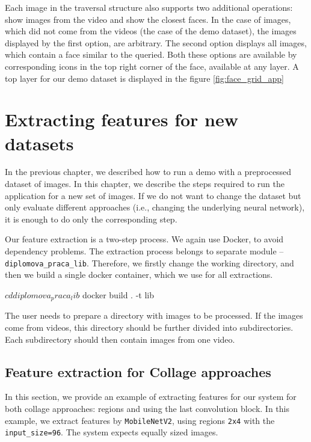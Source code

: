 Each image in the traversal structure also supports two additional operations: show images from the video and show the closest faces. In the case of images, which did not come from the videos (the case of the demo dataset), the images displayed by the first option, are arbitrary. The second option displays all images, which contain a face similar to the queried. Both these options are available by corresponding icons in the top right corner of the face, available at any layer. A top layer for our demo dataset is displayed in the figure \ref{fig:face_grid_app}


\chapter{Extracting features for new datasets}
\label{ch:custom_dataset}

In the previous chapter, we described how to run a demo with a preprocessed dataset of images. In this chapter, we describe the steps required to run the application for a new set of images. If we do not want to change the dataset but only evaluate different approaches (i.e., changing the underlying neural network), it is enough to do only the corresponding step.

Our feature extraction is a two-step process. We again use Docker, to avoid dependency problems. The extraction process belongs to separate module -- \verb+diplomova_praca_lib+. Therefore, we firstly change the working directory, and then we build a single docker container, which we use for all extractions.

\vspace{0.5cm}
\begin{boxedverbatim}
$ cd diplomova_praca_lib
$ docker build . -t lib
\end{boxedverbatim}
\vspace{0.5cm}

The user needs to prepare a directory with images to be processed. If the images come from videos, this directory should be further divided into subdirectories. Each subdirectory should then contain images from one video.

\section{Feature extraction for Collage approaches}

In this section, we provide an example of extracting features for our system for both collage approaches: regions and using the last convolution block. In this example, we extract features by \verb+MobileNetV2+, using regions \verb+2x4+ with the \verb+input_size=96+. The system expects equally sized images.

